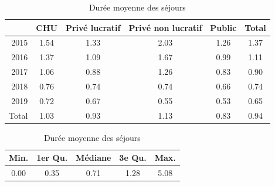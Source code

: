 \begin{table}[!ht]
\centering
\caption{Durée moyenne des séjours} 
\label{dms_MEMC0050}
\begin{tabular}{r|cccc|c}
  \hline
 & CHU & Privé lucratif & Privé non lucratif & Public & Total \\ 
  \hline
2015 & 1.54 & 1.33 & 2.03 & 1.26 & 1.37 \\ 
  2016 & 1.37 & 1.09 & 1.67 & 0.99 & 1.11 \\ 
  2017 & 1.06 & 0.88 & 1.26 & 0.83 & 0.90 \\ 
  2018 & 0.76 & 0.74 & 0.74 & 0.66 & 0.74 \\ 
  2019 & 0.72 & 0.67 & 0.55 & 0.53 & 0.65 \\ 
  \hline
  Total & 1.03 & 0.93 & 1.13 & 0.83 & 0.94 \\ 
   \hline
\end{tabular}

\bigskip

\begin{tabular}{ccccc}
  \hline
Min. & 1er Qu. & Médiane & 3e Qu. & Max. \\ 
  \hline
0.00 & 0.35 & 0.71 & 1.28 & 5.08 \\ 
   \hline
\end{tabular}
\end{table}

